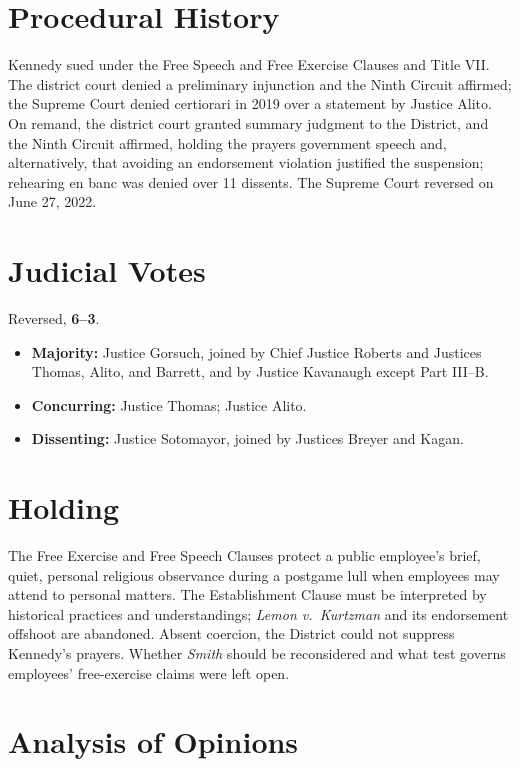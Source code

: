 \documentclass[12pt]{article}
\begin{document}
\section{Procedural History}

Kennedy sued under the Free Speech and Free Exercise Clauses and Title VII. The district court denied a preliminary injunction and the Ninth Circuit affirmed; the Supreme Court denied certiorari in 2019 over a statement by Justice Alito. On remand, the district court granted summary judgment to the District, and the Ninth Circuit affirmed, holding the prayers government speech and, alternatively, that avoiding an endorsement violation justified the suspension; rehearing en banc was denied over 11 dissents. The Supreme Court reversed on June 27, 2022.

\section{Judicial Votes}

Reversed, \textbf{6--3}.
\begin{itemize}
\item \textbf{Majority:} Justice Gorsuch, joined by Chief Justice Roberts and Justices Thomas, Alito, and Barrett, and by Justice Kavanaugh except Part III--B.
\item \textbf{Concurring:} Justice Thomas; Justice Alito.
\item \textbf{Dissenting:} Justice Sotomayor, joined by Justices Breyer and Kagan.
\end{itemize}

\section{Holding}

The Free Exercise and Free Speech Clauses protect a public employee's brief, quiet, personal religious observance during a postgame lull when employees may attend to personal matters. The Establishment Clause must be interpreted by historical practices and understandings; \textit{Lemon v.\ Kurtzman} and its endorsement offshoot are abandoned. Absent coercion, the District could not suppress Kennedy's prayers. Whether \textit{Smith} should be reconsidered and what test governs employees' free-exercise claims were left open.

\section{Analysis of Opinions}
\end{document}
